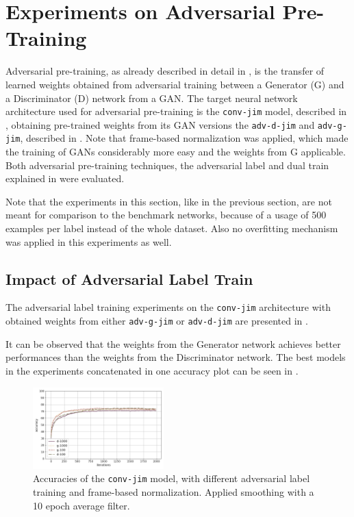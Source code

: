 
\section{Experiments on Adversarial Pre-Training}\label{sec:exp_adv}
\thesisStateRevised
Adversarial pre-training, as already described in detail in , is the transfer of learned weights obtained from adversarial training between a Generator (G) and a Discriminator (D) network from a GAN.
The target neural network architecture used for adversarial pre-training is the \texttt{conv-jim} model, described in , obtaining pre-trained weights from its GAN versions the \texttt{adv-d-jim} and \texttt{adv-g-jim}, described in .
Note that frame-based normalization was applied, which made the training of GANs considerably more easy and the weights from G applicable.
Both adversarial pre-training techniques, the adversarial label and dual train explained in  were evaluated.

Note that the experiments in this section, like in the previous section, are not meant for comparison to the benchmark networks, because of a usage of 500 examples per label instead of the whole dataset.
Also no overfitting mechanism was applied in this experiments as well.



\subsection{Impact of Adversarial Label Train}\label{sec:exp_adv_label}
The adversarial label training experiments on the \texttt{conv-jim} architecture with obtained weights from either \texttt{adv-g-jim} or \texttt{adv-d-jim} are presented in .

It can be observed that the weights from the Generator network achieves better performances than the weights from the Discriminator network.
The best models in the experiments concatenated in one accuracy plot can be seen in .
\begin{figure}[!ht]
  \centering
  \includegraphics[width=0.45\textwidth]{./5_exp/figs/exp_adv_label_acc_conv-jim.png}
  \caption{Accuracies of the \texttt{conv-jim} model, with different adversarial label training and frame-based normalization. Applied smoothing with a 10 epoch average filter.}
  \label{fig:exp_adv_label_acc_conv-jim}
\end{figure}
\FloatBarrier
\noindent

